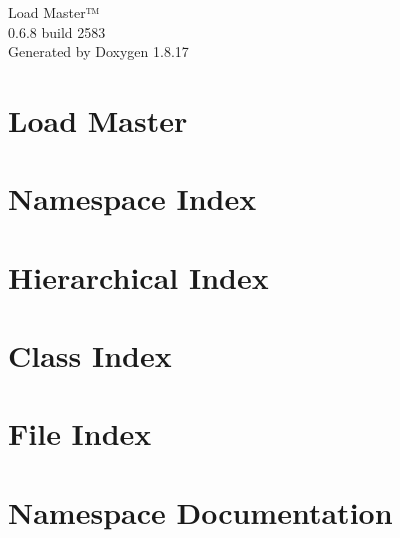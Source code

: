 \let\mypdfximage\pdfximage\def\pdfximage{\immediate\mypdfximage}\documentclass[twoside]{book}
\newcommand{\+}{\discretionary{\mbox{\scriptsize$\hookleftarrow$}}{}{}}
\newcommand{\clearemptydoublepage}{%
  \newpage{\pagestyle{empty}\cleardoublepage}%
}
\begin{document}
\hypersetup{pageanchor=false,
             bookmarksnumbered=true,
             pdfencoding=unicode
            }
\begin{titlepage}
\vspace*{7cm}
\begin{center}%
{\Large Load Master™ \\[1ex]\large 0.\+6.\+8 build 2583 }\\
\vspace*{1cm}
{\large Generated by Doxygen 1.8.17}\\
\end{center}
\end{titlepage}
\clearemptydoublepage
{}
\tableofcontents
\clearemptydoublepage
{}
\hypersetup{pageanchor=true}

\chapter{Load Master}
\label{index}\hypertarget{index}{}
\chapter{Namespace Index}

\chapter{Hierarchical Index}

\chapter{Class Index}

\chapter{File Index}

\chapter{Namespace Documentation}













\end{document}
